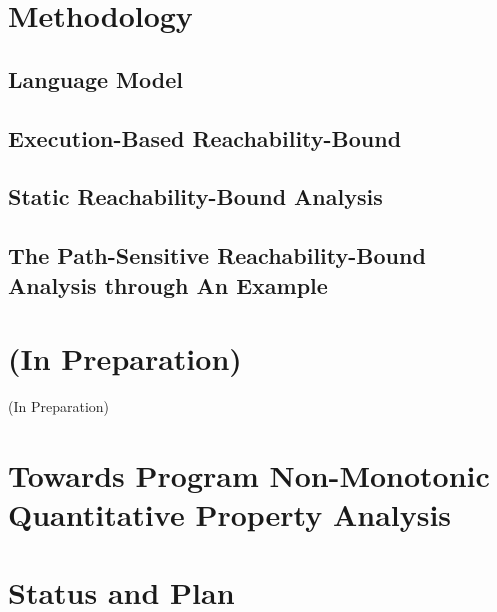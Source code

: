 \documentclass[a4paper,11pt]{article}
\begin{document}
\section{Methodology}
\label{sec:reachability-analysis}

\subsection{{Language Model}}
\label{sec:reachability-language}

\subsection{{Execution-Based Reachability-Bound}}
\label{sec:reachability-exe}

\subsection{{Static Reachability-Bound Analysis}}
\label{sec:reachability-static}


\subsection{The Path-Sensitive Reachability-Bound Analysis through An Example}
\label{sec:reachability-example}


\section*{(In Preparation)}
{\protect\numberline{}(In Preparation)}%

\section{Towards Program Non-Monotonic Quantitative Property Analysis }
\label{sec:generalization}


% 

\section{Status and Plan}
\label{sec:status-plan}




\end{document}
